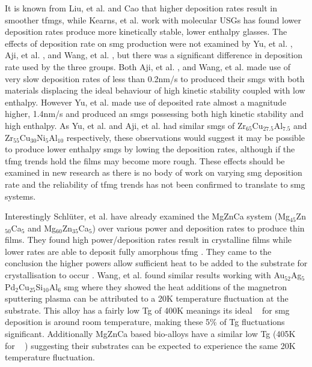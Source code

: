 \documentclass[a4paper,12pt,oneside]{report}%
\begin{document}
It is known from Liu, et al. \cite{Liu2012} and Cao \cite{Cao2013} that higher deposition rates result in smoother \glspl{tfmg}, while Kearns, et al. \cite{Kearns2008} work with molecular USGs has found lower deposition rates produce more kinetically stable, lower enthalpy glasses. The effects of deposition rate on \gls{smg} production were not examined by Yu, et al. \cite{Yu2013}, Aji, et al. \cite{Aji2013}, and Wang, et al. \cite{Wang2014}, but there was a significant difference in deposition rate used by the three groups. Both Aji, et al. \cite{Aji2013}, and Wang, et al. \cite{Wang2014} made use of very slow deposition rates of less than 0.2nm/s to produced their \glspl{smg} with both materials displacing the ideal behaviour of high kinetic stability coupled with low enthalpy. However Yu, et al. \cite{Yu2013} made use of deposited rate almost a magnitude higher, 1.4nm/s and produced an \glspl{smg} possessing both high kinetic stability and high enthalpy. As Yu, et al. \cite{Yu2013} and Aji, et al. \cite{Aji2013} had similar \glspl{smg} of Zr$_{65}$Cu$_{27.5}$Al$_{7.5}$ and Zr$_{55}$Cu$_{30}$Ni$_{5}$Al$_{10}$ respectively, these observations would suggest it may be possible to produce lower enthalpy \glspl{smg} by lowing the deposition rates, although if the \gls{tfmg} trends hold the films may become more rough. These effects should be examined in new research as there is no body of work on varying \gls{smg} deposition rate and the reliability of \gls{tfmg} trends has not been confirmed to translate to \gls{smg} systems. 

Interestingly Schlüter, et al. \cite{Schluter2012} have already examined the MgZnCa system (Mg$_{45}$Zn$_{50}$Ca$_{5}$ and Mg$_{60}$Zn$_{35}$Ca$_{5}$) over various power and deposition rates to produce thin films. They found high power/deposition rates result in crystalline films while lower rates are able to deposit fully amorphous  \gls{tfmg} \cite{Schluter2012}. They came to the conclusion the higher powers allow sufficient heat to be added to the substrate for crystallisation to occur \cite{Schluter2012}. Wang, et al. \cite{Wang2014} found similar results working with Au$_{52}$Ag$_{5}$Pd$_{2}$Cu$_{25}$Si$_{10}$Al$_{6}$ \gls{smg} where they showed the heat additions of the magnetron sputtering plasma can be attributed to a 20K temperature fluctuation at the substrate. This alloy has a fairly low \gls{Tg} of 400K meanings its ideal \Tsub~ for \gls{smg} deposition is around room temperature, making these 5\% of \gls{Tg} fluctuations significant. Additionally MgZnCa based bio-alloys have a similar low \gls{Tg} (405K for \MgZnCa~ \cite{Cao2013b, Gu2005}) suggesting their substrates can be expected to experience the same 20K temperature fluctuation. 
\end{document}
